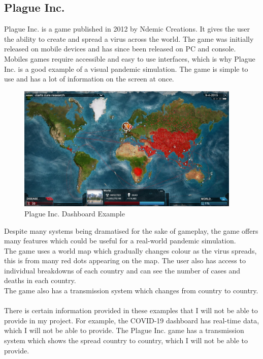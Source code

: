 \documentclass{report}
\begin{document}
\subsection{Plague Inc.}
Plague Inc. is a game published in 2012 by Ndemic Creations. It gives the user the ability to create and spread a virus across the world. The game was initially released on mobile devices and has since been released on PC and console. \cite{plagueinc}\\
Mobiles games require accessible and easy to use interfaces, which is why Plague Inc. is a good example of a visual pandemic simulation. The game is simple to use and has a lot of information on the screen at once.
\begin{center}
    \begin{figure}[h]
        \centering
        \includegraphics[width=0.95\textwidth]{Plague Inc Example.jpeg}
        \caption{Plague Inc. Dashboard Example}
        \label{fig:plagueinc_dashboard}
    \end{figure}
\end{center}
Despite many systems being dramatised for the sake of gameplay, the game offers many features which could be useful for a real-world pandemic simulation. \\
The game uses a world map which gradually changes colour as the virus spreads, this is from many red dots appearing on the map. The user also has access to individual breakdowns of each country and can see the number of cases and deaths in each country.\\ 
The game also has a transmission system which changes from country to country. 
\\ \\
There is certain information provided in these examples that I will not be able to provide in my project. For example, the COVID-19 dashboard has real-time data, which I will not be able to provide. The Plague Inc. game has a transmission system which shows the spread country to country, which I will not be able to provide.\\
\newpage
\end{document}
